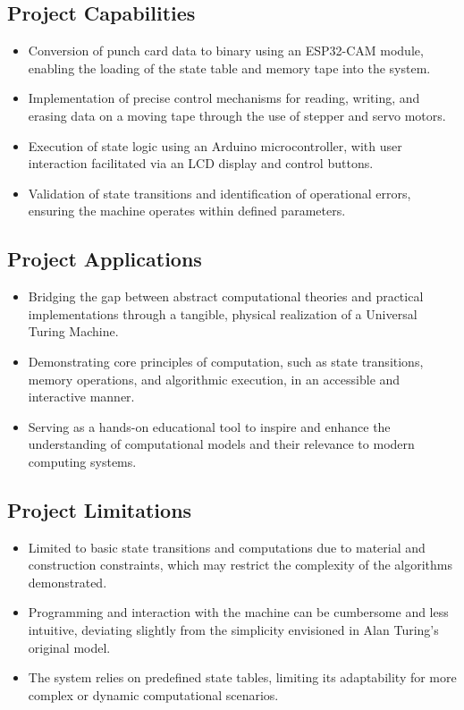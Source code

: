 \subsection{Project Capabilities}

\begin{itemize}
    \item Conversion of punch card data to binary using an ESP32-CAM module, enabling the loading of the state table and memory tape into the system.
    \item Implementation of precise control mechanisms for reading, writing, and erasing data on a moving tape through the use of stepper and servo motors.
    \item Execution of state logic using an Arduino microcontroller, with user interaction facilitated via an LCD display and control buttons.
    \item Validation of state transitions and identification of operational errors, ensuring the machine operates within defined parameters.
\end{itemize}

\subsection{Project Applications}

\begin{itemize}
    \item Bridging the gap between abstract computational theories and practical implementations through a tangible, physical realization of a Universal Turing Machine.
    \item Demonstrating core principles of computation, such as state transitions, memory operations, and algorithmic execution, in an accessible and interactive manner.
    \item Serving as a hands-on educational tool to inspire and enhance the understanding of computational models and their relevance to modern computing systems.
\end{itemize}

\subsection{Project Limitations}

\begin{itemize}
    \item Limited to basic state transitions and computations due to material and construction constraints, which may restrict the complexity of the algorithms demonstrated.
    \item Programming and interaction with the machine can be cumbersome and less intuitive, deviating slightly from the simplicity envisioned in Alan Turing’s original model.
    \item The system relies on predefined state tables, limiting its adaptability for more complex or dynamic computational scenarios.
\end{itemize}

